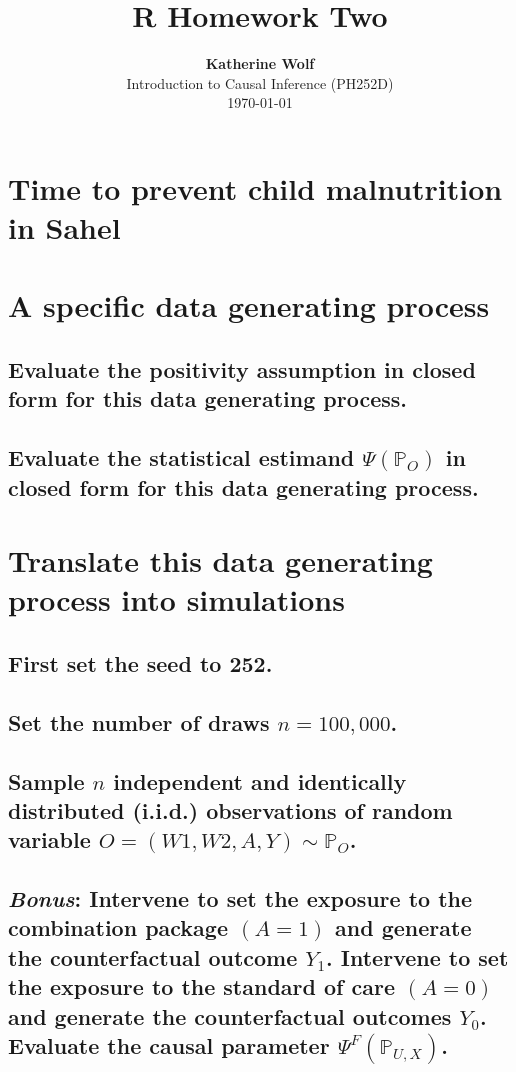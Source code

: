 \documentclass{article}\usepackage[]{graphicx}\usepackage[]{xcolor}
\title{\textbf{R Homework Two}}
\author{\textbf{Katherine Wolf}\\ Introduction to Causal Inference (PH252D)\\ \today}
\date{}
\begin{document}
\maketitle

\section{Time to prevent child malnutrition in Sahel}

\section{A specific data generating process}

  \subsection{Evaluate the positivity assumption in closed form for this data generating process.}
  
  \subsection{Evaluate the statistical estimand $\Psi(\mathbb{P}_O)$ in closed form for this data generating process.}
  
\section{Translate this data generating process into simulations}

  \subsection{First set the seed to 252.}
  
  \subsection{Set the number of draws $n = 100,000$.}
  
  \subsection{Sample $n$ independent and identically distributed (i.i.d.) observations of random variable $O=(W1,W2,A,Y) \sim \mathbb{P}_O$.}
  
  \subsection{\textit{Bonus}: Intervene to set the exposure to the combination package $(A=1)$ and generate the counterfactual outcome $Y_1$. Intervene to set the exposure to the standard of care $(A=0)$ and generate the counterfactual outcomes $Y_0$. Evaluate the causal parameter $\Psi^F(\mathbb{P}_{U,X})$.}
  
\end{document}
